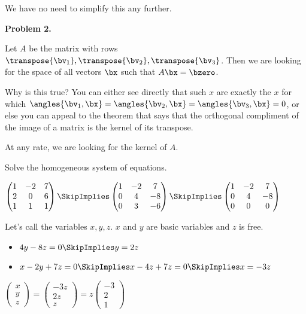 \documentclass[oneside,12pt]{amsart}
\begin{document}
We have no need to simplify this any further.

\bigskip

\textbf{Problem 2.}

\bigskip

Let $A$ be the matrix with rows $\transpose{\bv_1}, \transpose{\bv_2}, \transpose{\bv_3}$. Then we are looking
for the space of all vectors $\bx$ such that $A\bx=\bzero$.

\bigskip

Why is this true? You can either see directly that such $x$ are exactly the $x$ for which
$\angles{\bv_1,\bx}=\angles{\bv_2,\bx}=\angles{\bv_3,\bx}=0$, or else you
can appeal to the theorem that says that the orthogonal compliment of the
image of a matrix is the kernel of its transpose.

\bigskip

At any rate, we are looking for the kernel of $A$.

\bigskip

Solve the homogeneous system of equations.

\bigskip

$
\begin{pmatrix}
1 & -2 & 7\\
2 & 0 & 6 \\
1 & 1 & 1
\end{pmatrix}
\SkipImplies
\begin{pmatrix}
1 & -2 & 7 \\
0 & 4 & -8 \\
0 & 3 & -6
\end{pmatrix}
\SkipImplies
\begin{pmatrix}
1 & -2 & 7\\
0 & 4 & -8\\
0 & 0 & 0
\end{pmatrix}
$

\bigskip

Let's call the variables $x,y,z$. $x$ and $y$ are basic variables and $z$ is free.

\bigskip

\begin{itemize}
\item $4y - 8z = 0 \SkipImplies y = 2z$
\item $x -2y + 7z = 0 \SkipImplies x - 4z + 7z = 0 \SkipImplies x = -3z$
\end{itemize}

\bigskip

$
\begin{pmatrix}
x \\ y \\ z
\end{pmatrix}
=
\begin{pmatrix}
-3z \\ 2z \\ z
\end{pmatrix}
=
z
\begin{pmatrix}
-3 \\ 2 \\ 1
\end{pmatrix}
$
\end{document}
